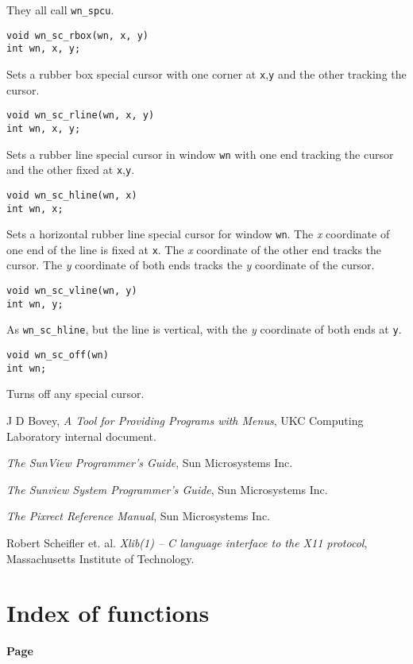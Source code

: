 They all call {\tt wn\_spcu}.
\begin{verbatim}
void wn_sc_rbox(wn, x, y)
int wn, x, y;
\end{verbatim}
Sets a rubber box special cursor with one corner at {\tt x},{\tt y} and the
other tracking the cursor.
\begin{verbatim}
void wn_sc_rline(wn, x, y)
int wn, x, y;
\end{verbatim}
Sets a rubber line special cursor in window {\tt wn} with one end tracking
the cursor and the other fixed at {\tt x},{\tt y}.
\begin{verbatim}
void wn_sc_hline(wn, x)
int wn, x;
\end{verbatim}
Sets a horizontal rubber line special cursor for window {\tt wn}.
The {\em x} coordinate of one end of the line is fixed at {\tt x}.
The {\em x} coordinate of the other end tracks the cursor.
The {\em y} coordinate of both ends tracks the {\em y} coordinate of the
cursor.
\begin{verbatim}
void wn_sc_vline(wn, y)
int wn, y;
\end{verbatim}
As {\tt wn\_sc\_hline}, but the line is vertical, with the {\em y} coordinate of
both ends at {\tt y}.
\begin{verbatim}
void wn_sc_off(wn)
int wn;
\end{verbatim}
Turns off any special cursor.
\begin{thebibliography}{99}
  J D Bovey,
{\em A Tool for Providing Programs with Menus},
UKC Computing Laboratory internal document.

{\em The SunView Programmer's Guide},
Sun Microsystems Inc.

{\em The Sunview System Programmer's Guide},
Sun Microsystems Inc.

{\em The Pixrect Reference Manual},
Sun Microsystems Inc.

 Robert Scheifler et. al.
{\em Xlib(1) -- C language interface to the X11 protocol},
Massachusetts Institute of Technology.

\end{thebibliography}
\newpage
\section{Index of functions}
\begin{small}
\begin{tabbing}
\hspace{5.25in}\={\bf \normalsize Page}\\

\end{tabbing}
\end{small}

